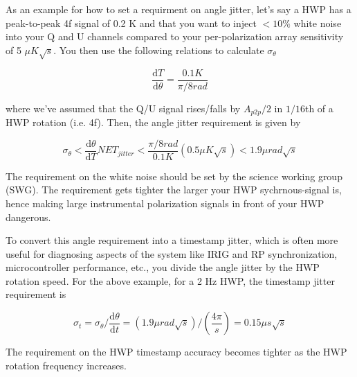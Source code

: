 As an example for how to set a requirment on angle jitter, let's say a HWP has a peak-to-peak 4f signal of 0.2 K and that you want to inject $< 10 \%$ white noise into your Q and U channels compared to your per-polarization array sensitivity of 5 $\mu K \sqrt{s}$. You then use the following relations to calculate $\sigma_{\theta}$

\begin{equation}
	\frac{\mathrm{d}T}{\mathrm{d}\theta}  = \frac{0.1 K}{\pi/8 rad}
\end{equation}

where we've assumed that the Q/U signal rises/falls by $A_{p2p}/2$ in $1/16$th of a HWP rotation (i.e. 4f). Then, the angle jitter requirement is given by

\begin{equation}
    	\sigma_{\theta} < \frac{\mathrm{d}\theta}{\mathrm{d}T} NET_{jitter} <  \frac{\pi/8 rad}{0.1 K} (0.5 \mu K \sqrt{s}) < 1.9 \mu rad \sqrt{s}
\end{equation}

The requirement on the white noise should be set by the science working group (SWG). The requirement gets tighter the larger your HWP sychrnous-signal is, hence making large instrumental polarization signals in front of your HWP dangerous.

To convert this angle requirement into a timestamp jitter, which is often more useful for diagnosing aspects of the system like IRIG and RP synchronization, microcontroller performance, etc., you divide the angle jitter by the HWP rotation speed. For the above example, for a 2 Hz HWP, the timestamp jitter requirement is

\begin{equation}
	\sigma_{t} = \sigma_{\theta} / \frac{\mathrm{d}\theta}{\mathrm{d}{t}} = (1.9 \mu rad \sqrt{s}) / (\frac{4 \pi}{s}) = 0.15 \mu s \sqrt{s}
\end{equation}

The requirement on the HWP timestamp accuracy becomes tighter as the HWP rotation frequency increases.
